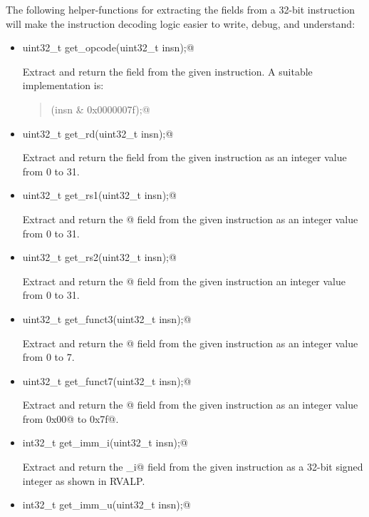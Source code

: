\documentclass[11pt]{article}
\begin{document}
The following helper-functions for extracting the fields from a 32-bit instruction 
will make the instruction decoding logic easier to write, debug, and understand:



\begin{itemize}

\item \verb@static uint32_t get_opcode(uint32_t insn);@

Extract and return the \verb@opcode@ field from the given instruction.
A suitable implementation is:

\begin{quote}
\verb@return (insn & 0x0000007f);@
\end{quote}

\item \verb@static uint32_t get_rd(uint32_t insn);@

Extract and return the \verb@rd@ field from the given instruction as 
an integer value from 0 to 31.

\item \verb@static uint32_t get_rs1(uint32_t insn);@

Extract and return the @ field from the given instruction 
as an integer value from 0 to 31.

\item \verb@static uint32_t get_rs2(uint32_t insn);@

Extract and return the @ field from the given instruction
an integer value from 0 to 31.

\item \verb@static uint32_t get_funct3(uint32_t insn);@

Extract and return the @ field from the given instruction
as an integer value from 0 to 7.

\item \verb@static uint32_t get_funct7(uint32_t insn);@

Extract and return the @ field from the given instruction
as an integer value from \verb@0x00@ to \verb@0x7f@.

\item \verb@static int32_t get_imm_i(uint32_t insn);@

Extract and return the \verb@imm_i@ field from the given instruction
as a 32-bit signed integer as shown in RVALP.

\item \verb@static int32_t get_imm_u(uint32_t insn);@


\end{itemize}
\end{document}
